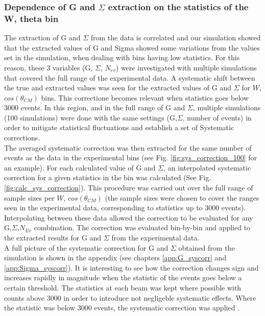 \subsubsection{Dependence of G and \texorpdfstring{$\Sigma$}{Sigma} extraction on the  statistics of the W, theta bin}\label{sec:G_Sigma_sys}
The extraction of G and $\Sigma$ from the data is correlated and our simulation showed that the extracted values of G and Sigma showed some variations from the values set in the simulation, when dealing with bins having low statistics.  For this reason, these 3 variables (G, $\Sigma$, $N_{ev}$) were investigated with multiple simulations that covered the full range of the experimental data. A systematic shift between the true and extracted values was seen for the extracted values of G and $\Sigma$ for $W$, $cos(\theta_{CM})$ bins. This correctione becomes relevant when statistics goes below 3000 events. In this region, and in the full range of G and $\Sigma$, multiple simulations (100 simulations) were done with the same settings (G,$\Sigma$, number of events) in order to mitigate statistical fluctuations and establish a set of Systematic corrections.  \\
The averaged systematic correction was then extracted for the same number of events as the data in the experimental bins (see Fig. \ref{fig:sys_correction_100} for an example). For each calculated value of G and $\Sigma$, an interpolated systematic correction for a given statistics in the bin was calculated (See Fig. \ref{fig:calc_sys_correction}). 
This procedure was carried out over the full range of sample sizes per $W$, $cos(\theta_{CM})$ (the sample sizes were chosen to cover the ranges seen in the experimental data, corresponding to statistics up to 3000 events). Interpolating between these data allowed the correction to be evaluated for any G,$\Sigma$,$N_{Ev}$ combination. The correction was evaluated bin-by-bin and applied to the extracted results for G and $\Sigma$ from the experimental data.  \\
A full picture of the systematic correction for G and $\Sigma$ obtained from the simulation is shown in the appendix (see chapters \ref{app:G_syscorr} and \ref{app:Sigma_syscorr}). It is interesting to see how the correction changes sign and increases rapidly in magnitude when the statistic of the events goes below a certain threshold. The statistics at each beam was kept where possible with counts above 3000 in order to introduce not negligeble systematic effects. Where the statistic was below 3000 events, the systematic correction was applied . 

